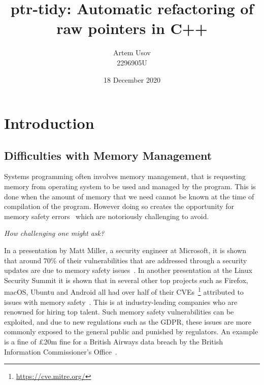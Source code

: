 \documentclass{proposal}
\begin{document}




    \title{ptr-tidy: Automatic refactoring of raw pointers in C++}
    \author{Artem Usov\\ 2296905U}
    \date{18 December 2020}
    \maketitle
    \tableofcontents
    \newpage




    \section{Introduction}\label{sec:intro}

    \subsection{Difficulties with Memory Management}\label{subsec:difficulties-with-memory-management}

    Systems programming often involves memory management, that is requesting memory from operating system to be used and managed by the program.
    This is done when the amount of memory that we need cannot be known at the time of compilation of the program.
    However doing so creates the opportunity for memory safety errors~\cite{Dhurjati2003} which are notoriously challenging to avoid.

    \emph{How challenging one might ask?}

    In a presentation by Matt Miller, a security engineer at Microsoft, it is shown that around 70\% of their vulnerabilities that are addressed through a security updates are due to memory safety issues~\cite{Miller2019}.
    In another presentation at the Linux Security Summit it is shown that in several other top projects such as Firefox, macOS, Ubuntu and Android all had over half of their CVEs~\footnote{\url{https://cve.mitre.org/}} attributed to issues with memory safety~\cite{Gaynor2020}.
    This is at industry-leading companies who are renowned for hiring top talent.
    Such memory safety vulnerabilities can be exploited, and due to new regulations such as the GDPR, these issues are more commonly exposed to the general public and punished by regulators.
    An example is a fine of £20m fine for a British Airways data breach by the British Information Commissioner's Office~\cite{ICO2020}.
\end{document}
